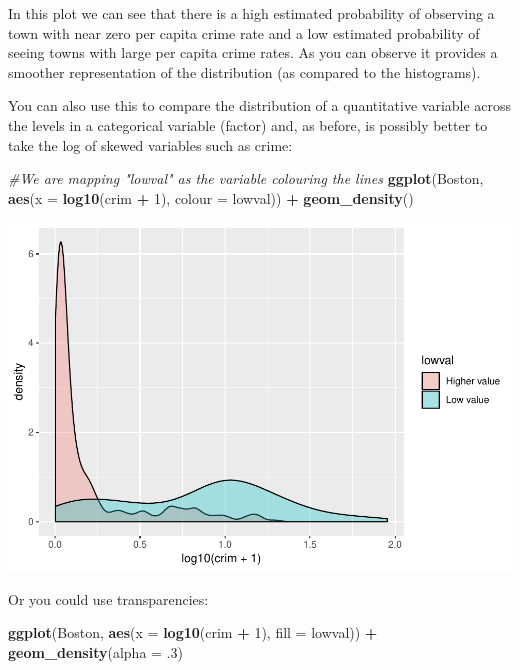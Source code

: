\documentclass[]{book}
\newenvironment{Shaded}{\begin{snugshade}}{\end{snugshade}}
\newcommand{\CommentTok}[1]{\textcolor[rgb]{0.56,0.35,0.01}{\textit{#1}}}
\newcommand{\DataTypeTok}[1]{\textcolor[rgb]{0.13,0.29,0.53}{#1}}
\newcommand{\DecValTok}[1]{\textcolor[rgb]{0.00,0.00,0.81}{#1}}
\newcommand{\FloatTok}[1]{\textcolor[rgb]{0.00,0.00,0.81}{#1}}
\newcommand{\KeywordTok}[1]{\textcolor[rgb]{0.13,0.29,0.53}{\textbf{#1}}}
\newcommand{\NormalTok}[1]{#1}
\newcommand{\OperatorTok}[1]{\textcolor[rgb]{0.81,0.36,0.00}{\textbf{#1}}}
\newcommand{\StringTok}[1]{\textcolor[rgb]{0.31,0.60,0.02}{#1}}
\theoremstyle{definition}
\theoremstyle{definition}
\theoremstyle{definition}
\theoremstyle{remark}
\begin{document}
In this plot we can see that there is a high estimated probability of
observing a town with near zero per capita crime rate and a low
estimated probability of seeing towns with large per capita crime rates.
As you can observe it provides a smoother representation of the
distribution (as compared to the histograms).

You can also use this to compare the distribution of a quantitative
variable across the levels in a categorical variable (factor) and, as
before, is possibly better to take the log of skewed variables such as
crime:

\begin{Shaded}
\begin{Highlighting}[]
\CommentTok{#We are mapping "lowval" as the variable colouring the lines }
\KeywordTok{ggplot}\NormalTok{(Boston, }\KeywordTok{aes}\NormalTok{(}\DataTypeTok{x =} \KeywordTok{log10}\NormalTok{(crim }\OperatorTok{+}\StringTok{ }\DecValTok{1}\NormalTok{), }\DataTypeTok{colour =}\NormalTok{ lowval)) }\OperatorTok{+}\StringTok{ }
\StringTok{  }\KeywordTok{geom_density}\NormalTok{() }
\end{Highlighting}
\end{Shaded}

\includegraphics{03-visualisation_files/figure-latex/unnamed-chunk-25-1.pdf}

Or you could use transparencies:

\begin{Shaded}
\begin{Highlighting}[]
\KeywordTok{ggplot}\NormalTok{(Boston, }\KeywordTok{aes}\NormalTok{(}\DataTypeTok{x =} \KeywordTok{log10}\NormalTok{(crim }\OperatorTok{+}\StringTok{ }\DecValTok{1}\NormalTok{), }\DataTypeTok{fill =}\NormalTok{ lowval)) }\OperatorTok{+}\StringTok{ }
\StringTok{  }\KeywordTok{geom_density}\NormalTok{(}\DataTypeTok{alpha =} \FloatTok{.3}\NormalTok{)}
\end{Highlighting}
\end{Shaded}
\end{document}
